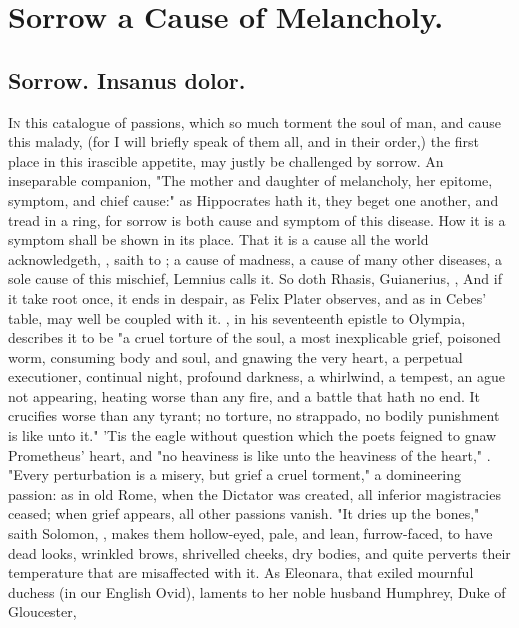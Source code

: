 \section{Sorrow a Cause of Melancholy.}

\subsection{Sorrow. \textlatin{Insanus dolor.}}

\lettrine{I}{n} this catalogue of passions, which so much torment the soul of
man, and cause this malady, (for I will briefly speak of them all, and in their
order,) the first place in this irascible appetite, may justly be challenged by
sorrow. An inseparable companion, "The mother and daughter
of melancholy, her epitome, symptom, and chief cause:" as Hippocrates hath it,
they beget one another, and tread in a ring, for sorrow is both cause and
symptom of this disease. How it is a symptom shall be shown in its place. That
it is a cause all the world acknowledgeth, , saith \Plutarch{} to \Apollonius{}; a cause
of madness, a cause of many other diseases, a sole cause of this mischief,
Lemnius calls it. So doth Rhasis,
 Guianerius,
, And if it take root once, it ends in
despair, as Felix Plater observes, and as in
Cebes' table, may well be coupled with it.
\Chrysostom{}, in his seventeenth epistle to Olympia,
describes it to be "a cruel torture of the soul, a most inexplicable grief,
poisoned worm, consuming body and soul, and gnawing the very heart, a perpetual
executioner, continual night, profound darkness, a whirlwind, a tempest, an
ague not appearing, heating worse than any fire, and a battle that hath no end.
It crucifies worse than any tyrant; no torture, no strappado, no bodily
punishment is like unto it." 'Tis the eagle without question which the poets
feigned to gnaw Prometheus' heart, and "no heaviness is
like unto the heaviness of the heart," .
"Every perturbation is a misery, but grief a cruel
torment," a domineering passion: as in old Rome, when the Dictator was created,
all inferior magistracies ceased; when grief appears, all other passions
vanish. "It dries up the bones," saith Solomon, , makes
them hollow-eyed, pale, and lean, furrow-faced, to have dead looks, wrinkled
brows, shrivelled cheeks, dry bodies, and quite perverts their temperature that
are misaffected with it. As Eleonara, that exiled mournful duchess (in our
English Ovid), laments to her noble husband Humphrey, Duke
of Gloucester,


